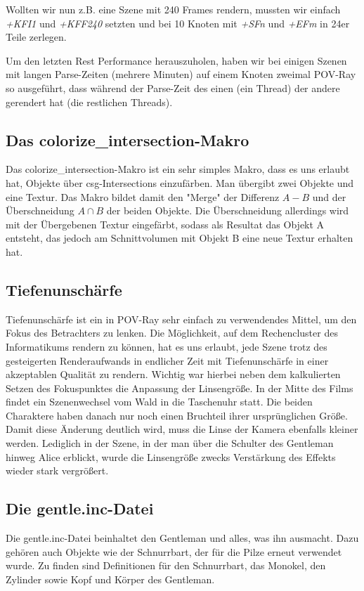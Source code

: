 \documentclass[twocolumn]{article}
\begin{document}
Wollten wir nun z.B. eine Szene mit 240 Frames rendern, mussten wir einfach \textit{+KFI1} und \textit{+KFF240} setzten und bei 10 Knoten mit \textit{+SFn} und \textit{+EFm} in 24er Teile zerlegen.
 

Um den letzten Rest Performance herauszuholen, haben wir bei einigen Szenen mit langen Parse-Zeiten (mehrere Minuten) auf einem Knoten zweimal POV-Ray so ausgeführt, dass während der Parse-Zeit des einen (ein Thread) der andere gerendert hat (die restlichen Threads).

\subsection{Das colorize\_intersection-Makro}
Das colorize\_intersection-Makro ist ein sehr simples Makro, dass es uns erlaubt hat, Objekte über csg-Intersections einzufärben.
Man übergibt zwei Objekte und eine Textur. Das Makro bildet damit den "Merge" der Differenz $A - B$ und der Überschneidung $A \cap B$ der beiden Objekte.
Die Überschneidung allerdings wird mit der Übergebenen Textur eingefärbt, sodass als Resultat das Objekt A entsteht, das jedoch am Schnittvolumen mit Objekt B eine neue Textur erhalten hat.

\subsection{Tiefenunschärfe}
Tiefenunschärfe ist ein in POV-Ray sehr einfach zu verwendendes Mittel, um den Fokus des Betrachters zu lenken.
Die Möglichkeit, auf dem Rechencluster des Informatikums rendern zu können, hat es uns erlaubt, jede Szene trotz des gesteigerten Renderaufwands in endlicher Zeit mit Tiefenunschärfe in einer akzeptablen Qualität zu rendern.
Wichtig war hierbei neben dem kalkulierten Setzen des Fokuspunktes die Anpassung der Linsengröße.
In der Mitte des Films findet ein Szenenwechsel vom Wald in die Taschenuhr statt.
Die beiden Charaktere haben danach nur noch einen Bruchteil ihrer ursprünglichen Größe. Damit diese Änderung deutlich wird, muss die Linse der Kamera ebenfalls kleiner werden.
Lediglich in der Szene, in der man über die Schulter des Gentleman hinweg Alice erblickt, wurde die Linsengröße zwecks Verstärkung des Effekts wieder stark vergrößert.

\subsection{Die gentle.inc-Datei} %
Die gentle.inc-Datei beinhaltet den Gentleman und alles, was ihn ausmacht. Dazu gehören auch Objekte wie der Schnurrbart, der für die Pilze erneut verwendet wurde.
Zu finden sind Definitionen für den Schnurrbart, das Monokel, den Zylinder sowie Kopf und Körper des Gentleman.
\end{document}
